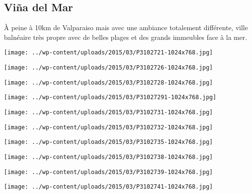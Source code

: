  \subsection*{Viña del Mar}
 \`A peine à 10km de Valparaiso mais avec une ambiance totalement différente, ville balnéaire très propre avec de belles plages et des grands immeubles face à la mer.
\begin{center} \texttt{[image: ../wp-content/uploads/2015/03/P3102721-1024x768.jpg]} \end{center}
\begin{center} \texttt{[image: ../wp-content/uploads/2015/03/P3102726-1024x768.jpg]} \end{center}
\begin{center} \texttt{[image: ../wp-content/uploads/2015/03/P3102728-1024x768.jpg]} \end{center}
\begin{center} \texttt{[image: ../wp-content/uploads/2015/03/P31027291-1024x768.jpg]} \end{center}
\begin{center} \texttt{[image: ../wp-content/uploads/2015/03/P3102731-1024x768.jpg]} \end{center}
\begin{center} \texttt{[image: ../wp-content/uploads/2015/03/P3102732-1024x768.jpg]} \end{center}
\begin{center} \texttt{[image: ../wp-content/uploads/2015/03/P3102735-1024x768.jpg]} \end{center}
\begin{center} \texttt{[image: ../wp-content/uploads/2015/03/P3102738-1024x768.jpg]} \end{center}
\begin{center} \texttt{[image: ../wp-content/uploads/2015/03/P3102739-1024x768.jpg]} \end{center}
\begin{center} \texttt{[image: ../wp-content/uploads/2015/03/P3102741-1024x768.jpg]} \end{center}
